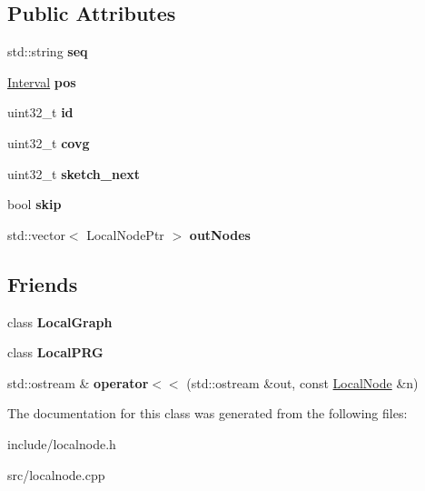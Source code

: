 \subsection*{Public Attributes}
\begin{DoxyCompactItemize}
\item 
\mbox{\label{classLocalNode_ab9782768a6be08070824665ef747239f}} 
std\+::string {\bfseries seq}
\item 
\mbox{\label{classLocalNode_af2831e1ceeaea3a483e8777f4e78d178}} 
\hyperlink{structInterval}{Interval} {\bfseries pos}
\item 
\mbox{\label{classLocalNode_a6d01c5dabe54dfd97ff0592c5c193463}} 
uint32\+\_\+t {\bfseries id}
\item 
\mbox{\label{classLocalNode_a9e10522ae9782ec417b91837f0f874c8}} 
uint32\+\_\+t {\bfseries covg}
\item 
\mbox{\label{classLocalNode_aa8bd262ead3022ae143543d53dd9183c}} 
uint32\+\_\+t {\bfseries sketch\+\_\+next}
\item 
\mbox{\label{classLocalNode_ac99a8a8eae84ee90cf4b0aa45d049a5f}} 
bool {\bfseries skip}
\item 
\mbox{\label{classLocalNode_afa38aeb939508833afdca842f42f9dad}} 
std\+::vector$<$ Local\+Node\+Ptr $>$ {\bfseries out\+Nodes}
\end{DoxyCompactItemize}
\subsection*{Friends}
\begin{DoxyCompactItemize}
\item 
\mbox{\label{classLocalNode_aac1fc722ed62c9cdcec0a666cbee3277}} 
class {\bfseries Local\+Graph}
\item 
\mbox{\label{classLocalNode_a99a72d107e31f7e3824a18ff7af2fbc5}} 
class {\bfseries Local\+P\+RG}
\item 
\mbox{\label{classLocalNode_a5e360852aa8d9c98f1be6b16d4c03d21}} 
std\+::ostream \& {\bfseries operator$<$$<$} (std\+::ostream \&out, const \hyperlink{classLocalNode}{Local\+Node} \&n)
\end{DoxyCompactItemize}


The documentation for this class was generated from the following files\+:\begin{DoxyCompactItemize}
\item 
include/localnode.\+h\item 
src/localnode.\+cpp\end{DoxyCompactItemize}
